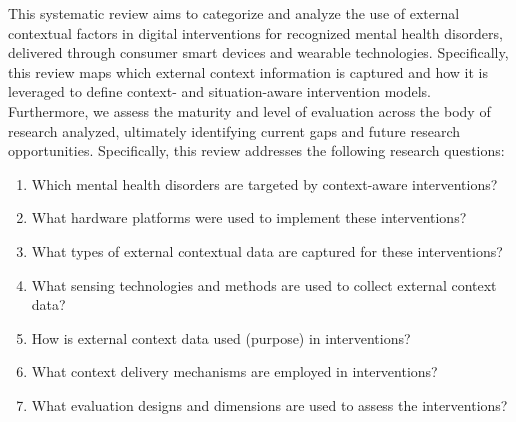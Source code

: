 This systematic review aims to categorize and analyze the use of external contextual factors in digital interventions for recognized mental health disorders, delivered through consumer smart devices and wearable technologies. Specifically, this review maps which external context information is captured and how it is leveraged to define context- and situation-aware intervention models. Furthermore, we assess the maturity and level of evaluation across the body of research analyzed, ultimately identifying current gaps and future research opportunities. %
Specifically, this review addresses the following research questions:
\begin{enumerate}[label=Q\arabic*, itemsep=0pt]   
    \item Which mental health disorders are targeted by context-aware interventions?
    \item What hardware platforms were used to implement these interventions?
    \item What types of external contextual data are captured for these interventions?
    \item What sensing technologies and methods are used to collect external context data?
    \item How is external context data used (purpose) in interventions? 
    \item What context delivery mechanisms are employed in interventions?
    \item What evaluation designs and dimensions are used to assess the interventions?
\end{enumerate}

